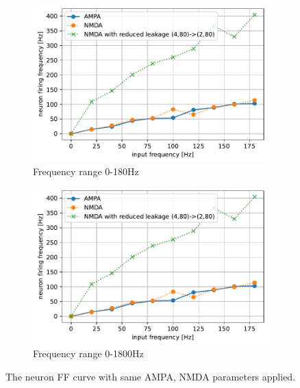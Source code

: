 \begin{figure}
	\begin{subfigure}{.5\textwidth}
		\centering
		\includegraphics[page=1, width=\columnwidth]{./img/implementation/synapse.pdf}
		\caption{Frequency range 0-180Hz}
		\label{fig:synapse_1}
	\end{subfigure}
	\begin{subfigure}{.5\textwidth}
		\centering
		\includegraphics[page=2, width=\columnwidth]{./img/implementation/synapse.pdf}
		\caption{Frequency range 0-1800Hz}
		\label{fig:synapse_2}
	\end{subfigure}
	\caption{The neuron FF curve with same AMPA, NMDA parameters applied.}
	\label{fig:synapse}
\end{figure}

